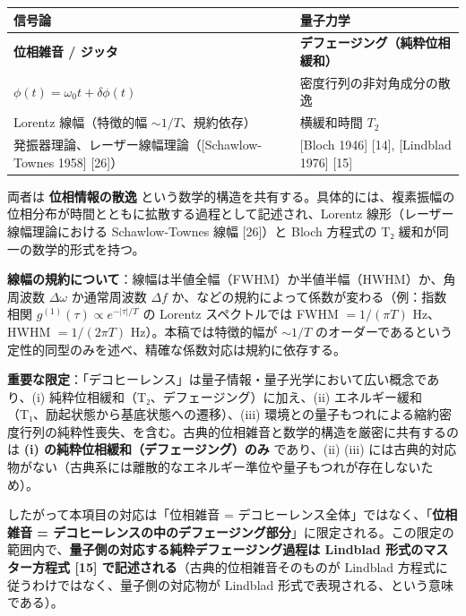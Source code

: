 \documentclass[
]{ltjsarticle}
\newcounter{none} %
\begin{document}
{\def\LTcaptype{none} %
\begin{longtable}[]{@{}
  >{\raggedright\arraybackslash}p{}
  >{\raggedright\arraybackslash}p{}@{}}
\toprule\noalign{}
\begin{minipage}[b]{\linewidth}\raggedright
信号論
\end{minipage} & \begin{minipage}[b]{\linewidth}\raggedright
量子力学
\end{minipage} \\
\midrule\noalign{}
\endhead
\bottomrule\noalign{}
\endlastfoot
\textbf{位相雑音 / ジッタ} & \textbf{デフェージング（純粋位相緩和）} \\
\(\phi(t) = \omega_0 t + \delta\phi(t)\) & 密度行列の非対角成分の散逸 \\
Lorentz 線幅（特徴的幅 \(\sim 1/T\)、規約依存） & 横緩和時間 \(T_2\) \\
発振器理論、レーザー線幅理論（{[}Schawlow-Townes 1958{]} {[}26{]}） &
{[}Bloch 1946{]} {[}14{]}, {[}Lindblad 1976{]} {[}15{]} \\
\end{longtable}
}

両者は \textbf{位相情報の散逸}
という数学的構造を共有する。具体的には、複素振幅の位相分布が時間とともに拡散する過程として記述され、Lorentz
線形（レーザー線幅理論における Schawlow-Townes 線幅 {[}26{]}）と Bloch
方程式の T₂ 緩和が同一の数学的形式を持つ。

\textbf{線幅の規約について}：線幅は半値全幅（FWHM）か半値半幅（HWHM）か、角周波数
\(\Delta\omega\) か通常周波数 \(\Delta f\)
か、などの規約によって係数が変わる（例：指数相関
\(g^{(1)}(\tau) \propto e^{-|\tau|/T}\) の Lorentz スペクトルでは FWHM
\(= 1/(\pi T)\) Hz、HWHM \(= 1/(2\pi T)\) Hz）。本稿では特徴的幅が
\(\sim 1/T\)
のオーダーであるという定性的同型のみを述べ、精確な係数対応は規約に依存する。

\textbf{重要な限定}：「デコヒーレンス」は量子情報・量子光学において広い概念であり、(i)
純粋位相緩和（T₂、デフェージング）に加え、(ii)
エネルギー緩和（T₁、励起状態から基底状態への遷移）、(iii)
環境との量子もつれによる縮約密度行列の純粋性喪失、を含む。古典的位相雑音と数学的構造を厳密に共有するのは
\textbf{(i) の純粋位相緩和（デフェージング）のみ} であり、(ii) (iii)
には古典的対応物がない（古典系には離散的なエネルギー準位や量子もつれが存在しないため）。

したがって本項目の対応は「位相雑音 =
デコヒーレンス全体」ではなく、「\textbf{位相雑音 =
デコヒーレンスの中のデフェージング部分}」に限定される。この限定の範囲内で、\textbf{量子側の対応する純粋デフェージング過程は
Lindblad 形式のマスター方程式 {[}15{]}
で記述される}（古典的位相雑音そのものが Lindblad
方程式に従うわけではなく、量子側の対応物が Lindblad
形式で表現される、という意味である）。
\end{document}
